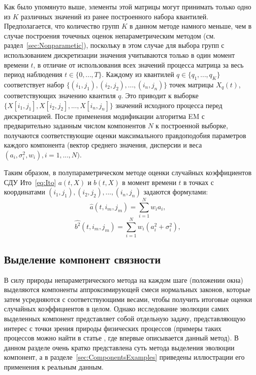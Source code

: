 Как было упомянуто выше, элементы этой матрицы могут принимать только одно из $K$ различных значений из ранее построенного набора квантилей. Предполагается, что количество групп $K$ в данном методе намного меньше, чем в случае построения точечных оценок непараметрическим методом (см. раздел~\ref{sec:Nonparametic}), поскольку в этом случае для выбора групп с использованием дискретизации значения учитываются только в один момент времени $t$, в отличие от использования всех значений процесса матрица за весь период наблюдения $t \in \{0,...,T\}$. Каждому из квантилей $q \in \{q_1,..., q_K\}$ соответствует набор $\{(i_1, j_1), (i_2, j_2),..., (i_n, j_n)\}$ точек матрицы $X_q(t)$, соответствующих значению квантиля $q$. Это приводит к выборке $\{X[i_1,j_1 ], X[i_2,j_2 ],...,X[i_n,j_n]\}$ значений исходного процесса перед дискретизацией. После применения модификации алгоритма EM с предварительно заданным числом компонентов $N$ к построенной выборке, получаются соответствующие оценки максимального правдоподобия параметров каждого компонента (вектор среднего значения, дисперсии и веса $(a_i,\sigma_i^2, w_i), i=1,...,N)$.


Таким образом, в полупараметрическом методе оценки случайных коэффициентов СДУ Ито~\ref{eq:Ito} $a(t, X)$ и $b(t,X)$ в момент времени $t$ в точках с координатами $(i_1, j_1), (i_2,j_2),..., (i_n, j_n)$ задаются формулами:
$$
\hat{a}(t, i_m, j_m) = \sum\limits_{i=1}^N w_i a_i,
$$
$$
\hat{b^2}(t, i_m, j_m) = \sum\limits_{i=1}^N w_i (a_i^2 + \sigma_i^2),
$$
\subsection{Выделение компонент связности}
\label{sec:Components}
В силу природы непараметрического метода на каждом шаге (положении окна) выделяются компоненты аппроксимирующей смеси нормальных законов, которые затем усредняются с соответствующими весами, чтобы получить итоговые оценки случайных коэффициентов в целом. Однако исследование эволюции самих выделенных компонент представляет собой отдельную задачу, представляющую интерес с точки зрения природы физических процессов (примеры таких процессов можно найти в статье \cite{2020_statistical_estimation_Langevin}, где впервые описывается данный метод). В данном разделе очень кратко представлена суть метода выделения эволюции компонент, а в разделе~\ref{sec:ComponentsExamples} приведены иллюстрации его применения к реальным данным.

